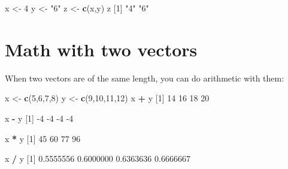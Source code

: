 \documentclass[]{book}
\newenvironment{Shaded}{\begin{snugshade}}{\end{snugshade}}
\newcommand{\DecValTok}[1]{\textcolor[rgb]{0.00,0.00,0.81}{#1}}
\newcommand{\FloatTok}[1]{\textcolor[rgb]{0.00,0.00,0.81}{#1}}
\newcommand{\KeywordTok}[1]{\textcolor[rgb]{0.13,0.29,0.53}{\textbf{#1}}}
\newcommand{\NormalTok}[1]{#1}
\newcommand{\OperatorTok}[1]{\textcolor[rgb]{0.81,0.36,0.00}{\textbf{#1}}}
\newcommand{\StringTok}[1]{\textcolor[rgb]{0.31,0.60,0.02}{#1}}
\begin{document}
\begin{Shaded}
\begin{Highlighting}[]
\NormalTok{x <-}\StringTok{ }\DecValTok{4}
\NormalTok{y <-}\StringTok{ "6"}
\NormalTok{z <-}\StringTok{ }\KeywordTok{c}\NormalTok{(x,y)}
\NormalTok{z}
\NormalTok{[}\DecValTok{1}\NormalTok{] }\StringTok{"4"} \StringTok{"6"}
\end{Highlighting}
\end{Shaded}

\hypertarget{math-with-two-vectors}{%
\section*{Math with two vectors}\label{math-with-two-vectors}}

When two vectors are of the same length, you can do arithmetic with them:

\begin{Shaded}
\begin{Highlighting}[]
\NormalTok{x <-}\StringTok{ }\KeywordTok{c}\NormalTok{(}\DecValTok{5}\NormalTok{,}\DecValTok{6}\NormalTok{,}\DecValTok{7}\NormalTok{,}\DecValTok{8}\NormalTok{)}
\NormalTok{y <-}\StringTok{ }\KeywordTok{c}\NormalTok{(}\DecValTok{9}\NormalTok{,}\DecValTok{10}\NormalTok{,}\DecValTok{11}\NormalTok{,}\DecValTok{12}\NormalTok{)}
\NormalTok{x }\OperatorTok{+}\StringTok{ }\NormalTok{y}
\NormalTok{[}\DecValTok{1}\NormalTok{] }\DecValTok{14} \DecValTok{16} \DecValTok{18} \DecValTok{20}
\end{Highlighting}
\end{Shaded}

\begin{Shaded}
\begin{Highlighting}[]
\NormalTok{x }\OperatorTok{-}\StringTok{ }\NormalTok{y}
\NormalTok{[}\DecValTok{1}\NormalTok{] }\DecValTok{-4} \DecValTok{-4} \DecValTok{-4} \DecValTok{-4}
\end{Highlighting}
\end{Shaded}

\begin{Shaded}
\begin{Highlighting}[]
\NormalTok{x }\OperatorTok{*}\StringTok{ }\NormalTok{y}
\NormalTok{[}\DecValTok{1}\NormalTok{] }\DecValTok{45} \DecValTok{60} \DecValTok{77} \DecValTok{96}
\end{Highlighting}
\end{Shaded}

\begin{Shaded}
\begin{Highlighting}[]
\NormalTok{x }\OperatorTok{/}\StringTok{ }\NormalTok{y}
\NormalTok{[}\DecValTok{1}\NormalTok{] }\FloatTok{0.5555556} \FloatTok{0.6000000} \FloatTok{0.6363636} \FloatTok{0.6666667}
\end{Highlighting}
\end{Shaded}
\end{document}
